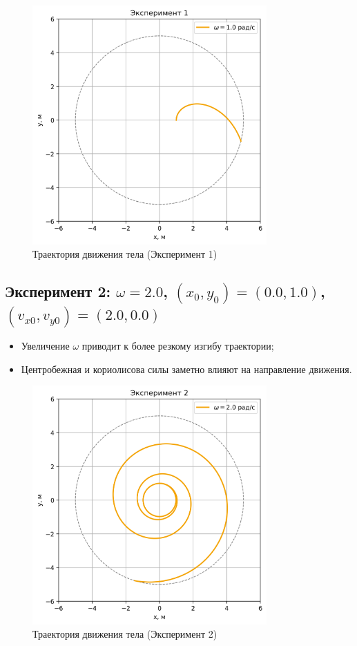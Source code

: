 \documentclass[a4paper,12pt]{article}
\begin{document}
\begin{figure}[H]
    \centering
    \includegraphics[width=0.8\textwidth]{plots/experiment_1.png}
    \caption{Траектория движения тела (Эксперимент 1)}
\end{figure}

\newpage

\subsection*{Эксперимент 2: $\omega = 2.0$, $(x_0, y_0) = (0.0, 1.0)$, $(v_{x0}, v_{y0}) = (2.0, 0.0)$}

\begin{itemize}
    \item Увеличение $\omega$ приводит к более резкому изгибу траектории;
    \item Центробежная и кориолисова силы заметно влияют на направление движения.
\end{itemize}

\begin{figure}[H]
    \centering
    \includegraphics[width=0.8\textwidth]{plots/experiment_2.png}
    \caption{Траектория движения тела (Эксперимент 2)}
\end{figure}
\end{document}
